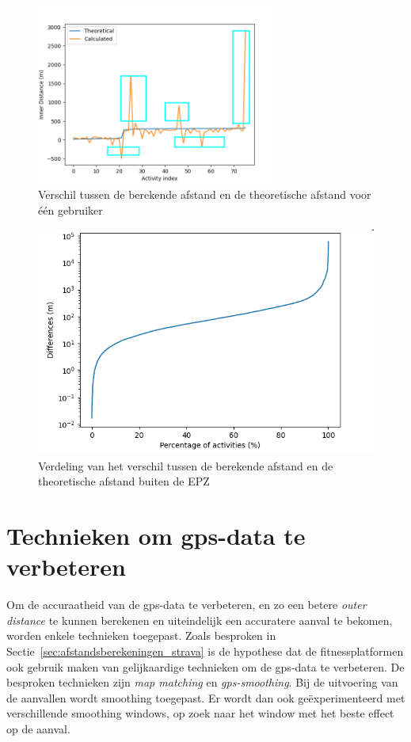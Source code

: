 \begin{figure}[h]
    \centering
    \includegraphics[width=0.7\textwidth]{fig/Afwijkingen&Analyses/Graphs/Verschil_Theoretische_innerDistance.png}
    \caption{Verschil tussen de berekende afstand en de theoretische afstand voor één gebruiker}\label{fig:difference_noCDF}
\end{figure}
\begin{figure}[h]
    \centering
    \includegraphics[width=\textwidth]{fig/Afwijkingen&Analyses/Graphs/100_Differences_tov_theoretische_BefSmoothening.png}
    \caption{Verdeling van het verschil tussen de berekende afstand en de theoretische afstand buiten de EPZ}\label{fig:differences_theoretical}
\end{figure}

\section{Technieken om gps-data te verbeteren}
Om de accuraatheid van de \ac{gps}-data te verbeteren, en zo een betere
\textit{outer distance} te kunnen berekenen en uiteindelijk een accuratere
aanval te bekomen, worden enkele technieken toegepast. Zoals besproken in
Sectie~\ref{sec:afstandsberekeningen_strava} is de hypothese dat de
fitnessplatformen ook gebruik maken van gelijkaardige technieken om de
\ac{gps}-data te verbeteren. De besproken technieken zijn \textit{map matching}
en \textit{\ac{gps}-smoothing}. Bij de uitvoering van de aanvallen wordt
smoothing toegepast. Er wordt dan ook geëxperimenteerd met verschillende
smoothing windows, op zoek naar het window met het beste effect op de aanval.

